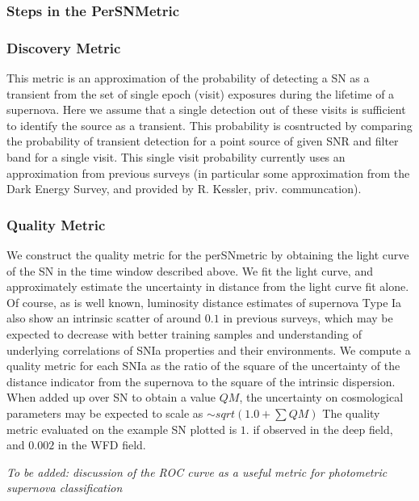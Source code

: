 \subsubsection{ Steps in the PerSNMetric}
\subsubsection{Discovery Metric}
This metric is an approximation of the probability of detecting a SN as a transient from the set of single epoch (visit) exposures during the lifetime of a
supernova. Here we assume that a single detection out of these visits is sufficient to identify the source as a transient. This probability is cosntructed
by comparing the probability of transient detection for a point source of
given SNR and filter band for a single visit. This single visit probability 
currently uses an approximation from previous surveys (in particular some approximation from the Dark Energy Survey, and provided by R. Kessler, priv. communcation).


\subsubsection{Quality Metric}
We construct the quality metric for the perSNmetric by obtaining the light curve of the SN in the time window described above. We fit the light curve, and 
approximately estimate the uncertainty in distance from the light curve fit alone. Of course, as is well known, luminosity distance estimates of supernova Type Ia also show an intrinsic scatter of around $0.1$ in previous surveys, which may be expected to decrease with better training samples and understanding 
of underlying correlations of SNIa properties and their environments. We compute a quality metric for each SNIa as the ratio of the square of the uncertainty of the distance indicator from the supernova to the square of the intrinsic dispersion. When added up over SN to obtain a value $QM$, the uncertainty on 
cosmological parameters may be expected to scale as $\sim sqrt(1.0 + \sum QM)$
The quality metric evaluated on the example SN plotted is $1.$ if observed in the deep field, and $0.002$ in the WFD field.

\emph{To be added: discussion of the ROC curve as a useful metric for photometric supernova 
classification}


